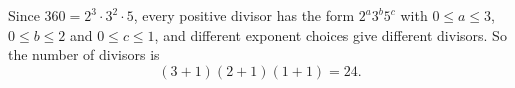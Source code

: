 Since $360=2^3\cdot3^2\cdot5$, every positive divisor has the form $2^a3^b5^c$ with $0\le a\le3$, $0\le b\le2$ and $0\le c\le1$, and different exponent choices give different divisors. So the number of divisors is
\[(3+1)(2+1)(1+1)=\boxed{24}.\]
